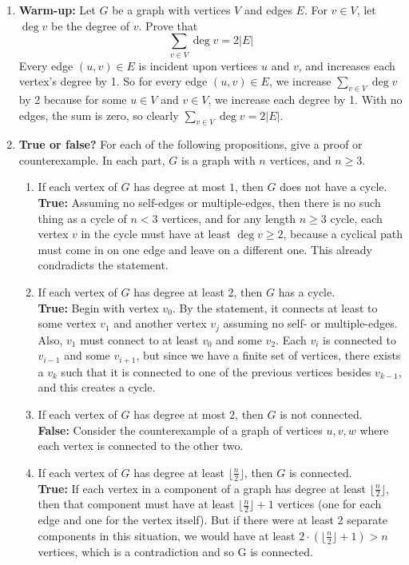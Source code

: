 \documentclass[11pt,fleqn]{article}
\begin{document}
\begin{enumerate}

\item \textbf{Warm-up:} Let $G$ be a graph with vertices $V$
and edges $E$.
For $v \in V$, let $\deg{v}$ be the degree of $v$.
Prove that
\[ \sum_{v \in V} \deg{v} = 2 |E| \]
Every edge $(u,v) \in E$ is incident upon vertices $u$ and $v$, and increases each vertex's degree by 1. So for every edge $(u,v) \in E$, we increase $\sum_{v \in V} \deg{v}$ by 2 because for some $u \in V$ and $v \in V$, we increase each degree by 1. With no edges, the sum is zero, so clearly $\sum_{v \in V} \deg{v} = 2 |E|$.

\newpage
\item \textbf{True or false?} 
For each of the following propositions, give a proof or counterexample.
In each part, $G$ is a graph with $n$ vertices, and $n \geq 3$.
\begin{enumerate}
\item If each vertex of $G$ has degree at most $1$, then $G$ does not have a cycle. \\
{\bf True:} Assuming no self-edges or multiple-edges, then there is no such thing as a cycle of $n<3$ vertices, and for any length $n\geq3$ cycle, each vertex $v$ in the cycle must have at least $\deg{v} \geq 2$, because a cyclical path must come in on one edge and leave on a different one. This already condradicts the statement.
\item If each vertex of $G$ has degree at least $2$, then $G$ has a cycle. \\
{\bf True:} Begin with vertex $v_0$. By the statement, it connects at least to some vertex $v_1$ and another vertex $v_j$ assuming no self- or multiple-edges. Also, $v_1$ must connect to at least $v_0$ and some $v_2$. Each $v_i$ is connected to $v_{i-1}$ and some $v_{i+1}$, but since we have a finite set of vertices, there exists a $v_k$ such that it is connected to one of the previous vertices besides $v_{k-1}$, and this creates a cycle.
\item If each vertex of $G$ has degree at most $2$, then $G$ is not connected. \\
{\bf False:} Consider the counterexample of a graph of vertices $u,v,w$ where each vertex is connected to the other two.
\item If each vertex of $G$ has degree at least $\lfloor \frac n2 \rfloor$,
then $G$ is connected. \\
{\bf True:} If each vertex in a component of a graph has degree at least $\lfloor \frac n2 \rfloor$, then that component must have at least $\lfloor \frac n2 \rfloor + 1$ vertices (one for each edge and one for the vertex itself). But if there were at least 2 separate components in this situation, we would have at least $2\cdot (\lfloor \frac n2 \rfloor + 1) > n$ vertices, which is a contradiction and so G is connected.
\end{enumerate}


\end{enumerate}
\end{document}
